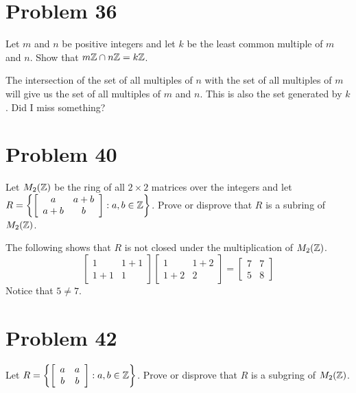 \documentclass{article}
\begin{document}
\section*{Problem 36}

Let $m$ and $n$ be positive integers and let $k$ be the least common multiple
of $m$ and $n$.  Show that $m\mathbb{Z}\cap n\mathbb{Z}=k\mathbb{Z}$.

The intersection of the set of all multiples of $n$ with the set of all multiples of $m$
will give us the set of all multiples of $m$ and $n$.  This is also the set
generated by $k$.  Did I miss something?

\section*{Problem 40}

Let $M_2(\mathbb{Z})$ be the ring of all $2\times 2$ matrices over the integers
and let $R=\left\{\left[\begin{array}{cc}a&a+b\\a+b&b\end{array}\right]:a,b\in\mathbb{Z}\right\}$.
Prove or disprove that $R$ is a subring of $M_2(\mathbb{Z})$.

The following shows that $R$ is not closed under the multiplication of $M_2(\mathbb{Z})$.
\begin{equation*}
\left[\begin{array}{cc}1&1+1\\1+1&1\end{array}\right]
\left[\begin{array}{cc}1&1+2\\1+2&2\end{array}\right] =
\left[\begin{array}{cc}7&7\\5&8\end{array}\right]
\end{equation*}
Notice that $5\neq 7$.

\section*{Problem 42}

Let $R=\left\{\left[\begin{array}{cc}a&a\\b&b\end{array}\right]:a,b\in\mathbb{Z}\right\}$.
Prove or disprove that $R$ is a subgring of $M_2(\mathbb{Z})$.
\end{document}
